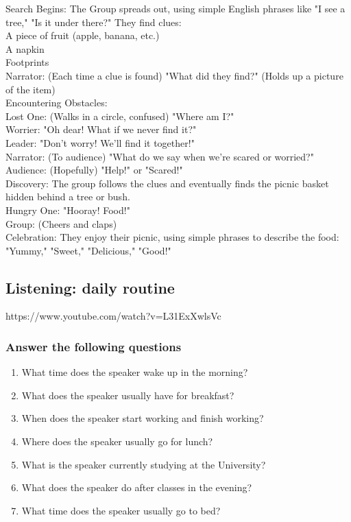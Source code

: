 \documentclass[]{article} %
\begin{document}
Search Begins: The Group spreads out, using simple English phrases like "I see a tree," "Is it under there?" They find clues:\\
A piece of fruit (apple, banana, etc.)\\
A napkin\\
Footprints\\
Narrator: (Each time a clue is found) "What did they find?" (Holds up a picture of the item)\\
Encountering Obstacles:\\
Lost One: (Walks in a circle, confused) "Where am I?"\\
Worrier: "Oh dear! What if we never find it?"\\
Leader: "Don't worry! We'll find it together!"\\
Narrator: (To audience) "What do we say when we're scared or worried?"\\
Audience: (Hopefully) "Help!" or "Scared!"\\
Discovery: The group follows the clues and eventually finds the picnic basket hidden behind a tree or bush.\\
Hungry One: "Hooray! Food!"\\
Group: (Cheers and claps)\\
Celebration: They enjoy their picnic, using simple phrases to describe the food: "Yummy," "Sweet," "Delicious," "Good!"\\

\iffalse
Additional Notes:
Flexibility: Encourage improvisation and adapt the sketch to your students' specific vocabulary level.
Repetition: Repeat key words and phrases throughout the sketch.
Visual Aids: Use props and gestures to reinforce vocabulary.
Engagement: Ask the audience questions and encourage them to participate in the story.
\fi

\subsection{Listening: daily routine}
https://www.youtube.com/watch?v=L31ExXwlsVc 

\subsubsection*{Answer the following questions}
\begin{enumerate}
	\item What time does the speaker wake up in the morning?
\item What does the speaker usually have for breakfast?
\item When does the speaker start working and finish working?
\item Where does the speaker usually go for lunch?
\item What is the speaker currently studying at the University?
\item What does the speaker do after classes in the evening?
\item What time does the speaker usually go to bed?
\end{enumerate}
\end{document}
